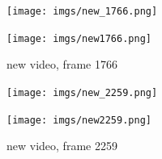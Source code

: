 \documentclass[bibliography=totoc]{scrartcl}
\begin{document}
\begin{figure}[H]
	\texttt{[image: imgs/new\_1766.png]}
	\par\bigskip
	\texttt{[image: imgs/new1766.png]}
	\caption{new video, frame 1766}
	\label{fig:res3}
\end{figure}

\begin{figure}[H]
	\texttt{[image: imgs/new\_2259.png]}
	\par\bigskip
	\texttt{[image: imgs/new2259.png]}
	\caption{new video, frame 2259}
	\label{fig:res4}
\end{figure}




\clearpage


\end{document}
